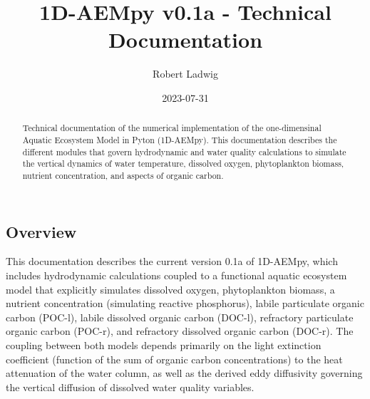 \documentclass[
  letterpaper,
  DIV=11,
  numbers=noendperiod]{scrartcl}
\title{1D-AEMpy v0.1a - Technical Documentation}
\author{Robert Ladwig}
\date{2023-07-31}
\begin{document}
\maketitle
\begin{abstract}
Technical documentation of the numerical implementation of the
one-dimensinal Aquatic Ecosystem Model in Pyton (1D-AEMpy). This
documentation describes the different modules that govern hydrodynamic
and water quality calculations to simulate the vertical dynamics of
water temperature, dissolved oxygen, phytoplankton biomass, nutrient
concentration, and aspects of organic carbon.
\end{abstract}
\ifdefined\Shaded\renewenvironment{Shaded}{\begin{tcolorbox}[boxrule=0pt, borderline west={3pt}{0pt}{shadecolor}, enhanced, breakable, sharp corners, frame hidden, interior hidden]}{\end{tcolorbox}}\fi

\hypertarget{overview}{%
\subsection{Overview}\label{overview}}

This documentation describes the current version 0.1a of 1D-AEMpy, which
includes hydrodynamic calculations coupled to a functional aquatic
ecosystem model that explicitly simulates dissolved oxygen,
phytoplankton biomass, a nutrient concentration (simulating reactive
phosphorus), labile particulate organic carbon (POC-l), labile dissolved
organic carbon (DOC-l), refractory particulate organic carbon (POC-r),
and refractory dissolved organic carbon (DOC-r). The coupling between
both models depends primarily on the light extinction coefficient
(function of the sum of organic carbon concentrations) to the heat
attenuation of the water column, as well as the derived eddy diffusivity
governing the vertical diffusion of dissolved water quality variables.
\end{document}
